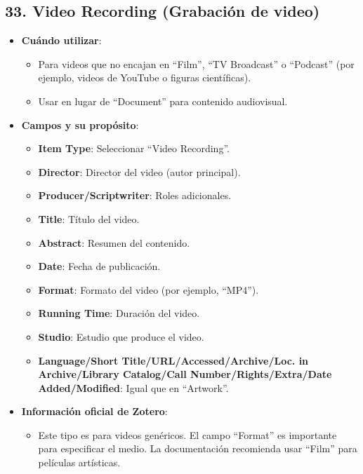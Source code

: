 \documentclass[
  jou,
  floatsintext,
  longtable,
  a4paper,
  nolmodern,
  notxfonts,
  notimes,
  colorlinks=true,linkcolor=blue,citecolor=blue,urlcolor=blue]{apa7}
\providecommand{\tightlist}{%
  \setlength{\itemsep}{0pt}\setlength{\parskip}{0pt}}
\begin{document}
\subsection{33. Video Recording (Grabación de
video)}\label{video-recording-grabaciuxf3n-de-video}

\begin{itemize}
\tightlist
\item
  \textbf{Cuándo utilizar}:

  \begin{itemize}
  \tightlist
  \item
    Para videos que no encajan en ``Film'', ``TV Broadcast'' o
    ``Podcast'' (por ejemplo, videos de YouTube o figuras científicas).
  \item
    Usar en lugar de ``Document'' para contenido audiovisual.
  \end{itemize}
\item
  \textbf{Campos y su propósito}:

  \begin{itemize}
  \tightlist
  \item
    \textbf{Item Type}: Seleccionar ``Video Recording''.
  \item
    \textbf{Director}: Director del video (autor principal).
  \item
    \textbf{Producer/Scriptwriter}: Roles adicionales.
  \item
    \textbf{Title}: Título del video.
  \item
    \textbf{Abstract}: Resumen del contenido.
  \item
    \textbf{Date}: Fecha de publicación.
  \item
    \textbf{Format}: Formato del video (por ejemplo, ``MP4'').
  \item
    \textbf{Running Time}: Duración del video.
  \item
    \textbf{Studio}: Estudio que produce el video.
  \item
    \textbf{Language/Short Title/URL/Accessed/Archive/Loc. in
    Archive/Library Catalog/Call Number/Rights/Extra/Date
    Added/Modified}: Igual que en ``Artwork''.
  \end{itemize}
\item
  \textbf{Información oficial de Zotero}:

  \begin{itemize}
  \tightlist
  \item
    Este tipo es para videos genéricos. El campo ``Format'' es
    importante para especificar el medio. La documentación recomienda
    usar ``Film'' para películas artísticas.
  \end{itemize}
\end{itemize}
\end{document}
